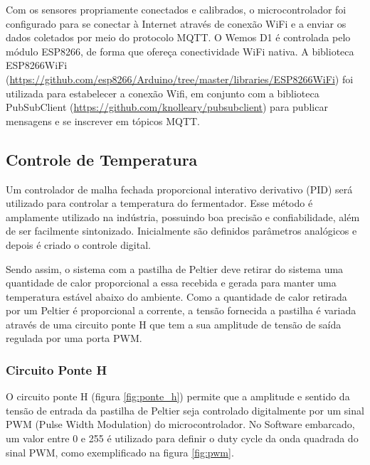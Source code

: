 Com os sensores propriamente conectados e calibrados, o microcontrolador foi configurado para se conectar à Internet através de conexão WiFi e a enviar os dados coletados por meio do protocolo MQTT. O Wemos D1 é controlada pelo módulo ESP8266, de forma que ofereça conectividade WiFi nativa. 
A biblioteca ESP8266WiFi (\url{https://github.com/esp8266/Arduino/tree/master/libraries/ESP8266WiFi}) foi utilizada para estabelecer a conexão Wifi, em conjunto com a biblioteca PubSubClient (\url{https://github.com/knolleary/pubsubclient}) para publicar mensagens e se inscrever em tópicos MQTT. 




\subsection{Controle de Temperatura}

Um controlador de malha fechada proporcional interativo derivativo (PID) será utilizado para controlar a temperatura do fermentador. Esse método é amplamente utilizado na indústria, possuindo boa precisão e confiabilidade, além de ser facilmente sintonizado. Inicialmente são definidos parâmetros analógicos e depois é criado o controle digital.


Sendo assim, o sistema com a pastilha de Peltier deve retirar do sistema uma quantidade de calor proporcional a essa recebida e gerada para manter uma temperatura estável abaixo do ambiente. Como a quantidade de calor retirada por um Peltier é proporcional a corrente, a tensão fornecida a pastilha é variada através de uma circuito ponte H que tem a sua amplitude de tensão de saída regulada por uma porta PWM.  

\subsubsection{Circuito Ponte H}

O circuito ponte H (figura \ref{fig:ponte_h}) permite que a amplitude e sentido da tensão de entrada da pastilha de Peltier seja controlado digitalmente por um sinal PWM (Pulse Width Modulation) do microcontrolador. No Software embarcado, um valor entre 0 e 255 é utilizado para definir o duty cycle da onda quadrada do sinal PWM, como exemplificado na figura \ref{fig:pwm}. 


